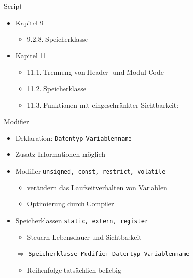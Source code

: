 
\begin{frame}[t,plain]
\titlepage
\end{frame}


\begin{frame}{Script}
%
\begin{itemize}
\item Kapitel 9
	\begin{itemize}
	\item 9.2.8. Speicherklasse 
	\end{itemize}
\item Kapitel 11
	\begin{itemize}
	\item 11.1. Trennung von Header- und Modul-Code
	\item 11.2. Speicherklasse 
	\item 11.3. Funktionen mit eingeschränkter Sichtbarkeit: 
	\end{itemize}
\end{itemize}
%
\end{frame}


\begin{frame}[fragile]{Modifier}
%
\begin{itemize}
\item Deklaration: \texttt{Datentyp Variablenname}
\item Zusatz-Informationen möglich
\item Modifier \texttt{unsigned, const, restrict, volatile}
	\begin{itemize}
	\item verändern das Laufzeitverhalten von Variablen
	\item Optimierung durch Compiler
	\end{itemize}
\item Speicherklassen \texttt{static, extern, register}
	\begin{itemize}
	\item Steuern Lebensdauer und Sichtbarkeit
	\end{itemize}
\item[$\Rightarrow$] \texttt{Speicherklasse Modifier Datentyp Variablenname}
	\begin{itemize}
	\item Reihenfolge tatsächlich beliebig
	\end{itemize}
\end{itemize}
%
\end{frame}

